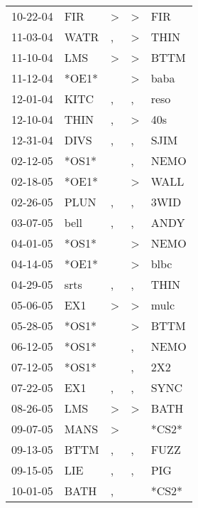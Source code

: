 \begin{supertabular}{lllll}
 10-22-04 &    FIR &  \textgreater &     \textgreater &    FIR \\
 11-03-04 &   WATR &             , &     \textgreater &   THIN \\
 11-10-04 &    LMS &  \textgreater &     \textgreater &   BTTM \\
 11-12-04 &  *OE1* &               &     \textgreater &   baba \\
 12-01-04 &   KITC &             , &                , &   reso \\
 12-10-04 &   THIN &             , &     \textgreater &    40s \\
 12-31-04 &   DIVS &             , &                , &   SJIM \\
 02-12-05 &  *OS1* &               &                , &   NEMO \\
 02-18-05 &  *OE1* &               &     \textgreater &   WALL \\
 02-26-05 &   PLUN &             , &                , &   3WID \\
 03-07-05 &   bell &             , &                , &   ANDY \\
 04-01-05 &  *OS1* &               &     \textgreater &   NEMO \\
 04-14-05 &  *OE1* &               &     \textgreater &   blbc \\
 04-29-05 &   srts &             , &                , &   THIN \\
 05-06-05 &    EX1 &  \textgreater &     \textgreater &   mulc \\
 05-28-05 &  *OS1* &               &     \textgreater &   BTTM \\
 06-12-05 &  *OS1* &               &                , &   NEMO \\
 07-12-05 &  *OS1* &               &                , &    2X2 \\
 07-22-05 &    EX1 &             , &                , &   SYNC \\
 08-26-05 &    LMS &  \textgreater &     \textgreater &   BATH \\
 09-07-05 &   MANS &  \textgreater &                  &  *CS2* \\
 09-13-05 &   BTTM &             , &                , &   FUZZ \\
 09-15-05 &    LIE &             , &                , &    PIG \\
 10-01-05 &   BATH &             , &                  &  *CS2* \\

\end{supertabular}
